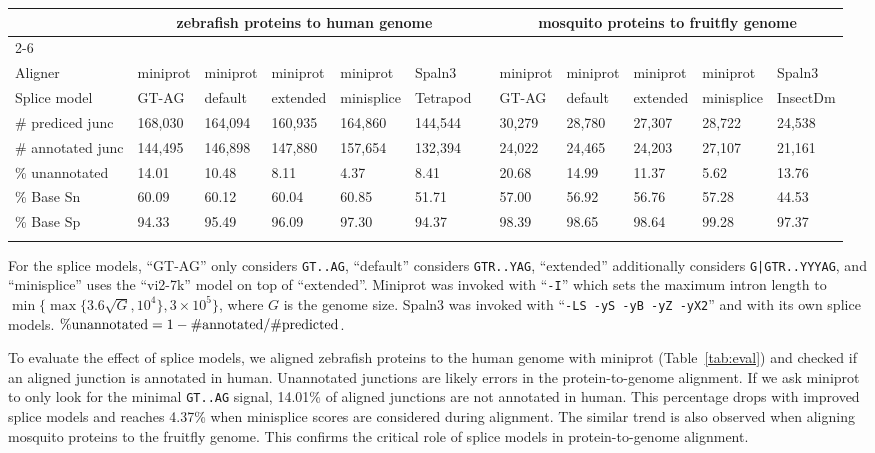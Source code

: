 \documentclass[webpdf,contemporary,large,namedate]{oup-authoring-template}%
\begin{document}
\begin{table*}[!tb]
\caption{Effect of splice site models on protein-to-genome alignment\label{tab:eval}}
\begin{tabular*}{\textwidth}{@{\extracolsep\fill}llllllclllll@{\extracolsep\fill}}
\toprule
& \multicolumn{5}{c}{zebrafish proteins to human genome} && \multicolumn{5}{c}{mosquito proteins to fruitfly genome} \\[0.4em]
\cline{2-6}\cline{8-12}\\[-0.9em]
Aligner           & miniprot  & miniprot  & miniprot  & miniprot   & Spaln3    && miniprot & miniprot & miniprot & miniprot   & Spaln3 \\
Splice model      & GT-AG     & default   & extended  & minisplice & Tetrapod  && GT-AG    & default  & extended & minisplice & InsectDm \\
\midrule
\# prediced junc  & 168,030   & 164,094   & 160,935   & 164,860    & 144,544   && 30,279   & 28,780   & 27,307   & 28,722     & 24,538 \\
\# annotated junc & 144,495   & 146,898   & 147,880   & 157,654    & 132,394   && 24,022   & 24,465   & 24,203   & 27,107     & 21,161 \\
\% unannotated    & 14.01     & 10.48     & 8.11      & 4.37       & 8.41      && 20.68    & 14.99    & 11.37    & 5.62       & 13.76 \\
\% Base Sn        & 60.09     & 60.12     & 60.04     & 60.85      & 51.71     && 57.00    & 56.92    & 56.76    & 57.28      & 44.53 \\
\% Base Sp        & 94.33     & 95.49     & 96.09     & 97.30      & 94.37     && 98.39    & 98.65    & 98.64    & 99.28      & 97.37 \\
\botrule
\end{tabular*}
\begin{tablenotes}\setlength\itemsep{0.0em}
For the splice models, ``GT-AG'' only considers {\tt GT..AG},
``default'' considers {\tt GTR..YAG},
``extended'' additionally considers {\tt G|GTR..YYYAG},
and ``minisplice'' uses the ``vi2-7k'' model on top of ``extended''.
Miniprot was invoked with ``{\tt -I}'' which sets the maximum intron length to $\min\{\max\{3.6\sqrt{G},10^4\},3\times10^5\}$, where $G$ is the genome size.
Spaln3 was invoked with ``{\tt -LS -yS -yB -yZ -yX2}'' and with its own splice models.
${\rm\%unannotated}=1-{\rm\#annotated}/{\rm\#predicted}$.
\end{tablenotes}
\end{table*}

To evaluate the effect of splice models,
we aligned zebrafish proteins to the human genome with miniprot (Table~\ref{tab:eval})
and checked if an aligned junction is annotated in human.
Unannotated junctions are likely errors in the protein-to-genome alignment.
If we ask miniprot to only look for the minimal {\tt GT..AG} signal, 14.01\% of aligned junctions are not annotated in human.
This percentage drops with improved splice models
and reaches 4.37\% when minisplice scores are considered during alignment.
The similar trend is also observed when aligning mosquito proteins to the fruitfly genome.
This confirms the critical role of splice models in protein-to-genome alignment.
\end{document}
